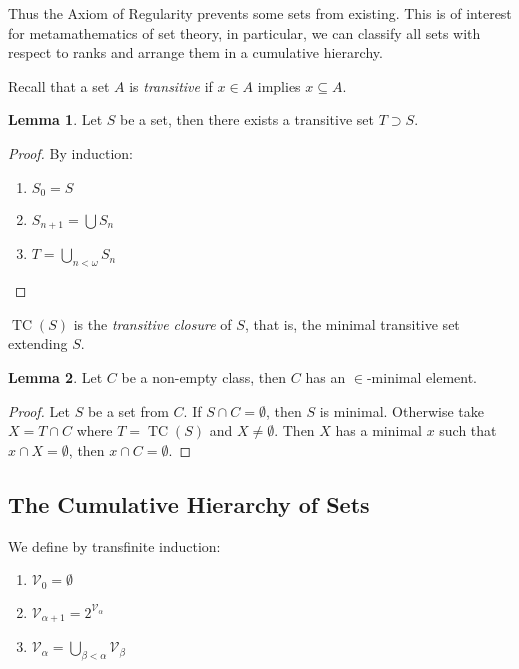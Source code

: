 \documentclass[8pt]{article}
\theoremstyle{definition}
\theoremstyle{definition}
\theoremstyle{definition}
\theoremstyle{definition}
\theoremstyle{definition}
\theoremstyle{definition}
\theoremstyle{definition}
\theoremstyle{definition}
\newtheorem{lemma}{Lemma}[section]
\theoremstyle{definition}
\theoremstyle{definition}
\theoremstyle{definition}
\theoremstyle{definition}
\theoremstyle{definition}
\theoremstyle{definition}
\theoremstyle{question}
\begin{document}
Thus the Axiom of Regularity prevents some sets from existing. This is of interest for metamathematics of set theory, in
particular, we can classify all sets with respect to ranks and arrange them in a cumulative hierarchy.

Recall that a set $A$ is \emph{transitive} if $x \in A$ implies $x \subseteq A$.

\begin{lemma}
  Let $S$ be a set, then there exists a transitive set $T \supset S$.
\end{lemma}
\begin{proof}
  By induction:

  \begin{enumerate}
    \item $S_0 = S$
    \item $S_{n + 1} = \bigcup S_n$
    \item $T = \bigcup \limits_{n < \omega} S_n$
  \end{enumerate}
\end{proof}

$\operatorname{TC}(S)$ is the \emph{transitive closure} of $S$, that is, the minimal transitive set extending $S$.

\begin{lemma}
  Let $C$ be a non-empty class, then $C$ has an $\in$-minimal element.
\end{lemma}

\begin{proof}
  Let $S$ be a set from $C$. If $S \cap C = \emptyset$, then $S$ is minimal.
  Otherwise take $X = T \cap C$ where $T = \operatorname{TC}(S)$ and $X \neq \emptyset$.
  Then $X$ has a minimal $x$ such that $x \cap X = \emptyset$, then $x \cap C = \emptyset$.
\end{proof}

\subsection{The Cumulative Hierarchy of Sets}

We define by transfinite induction:

\begin{enumerate}
  \item $\mathcal{V}_0 = \emptyset$
  \item $\mathcal{V}_{\alpha + 1} = 2^{\mathcal{V}_\alpha}$
  \item $\mathcal{V}_{\alpha} = \bigcup \limits_{\beta < \alpha} \mathcal{V}_{\beta}$
\end{enumerate}
\end{document}

